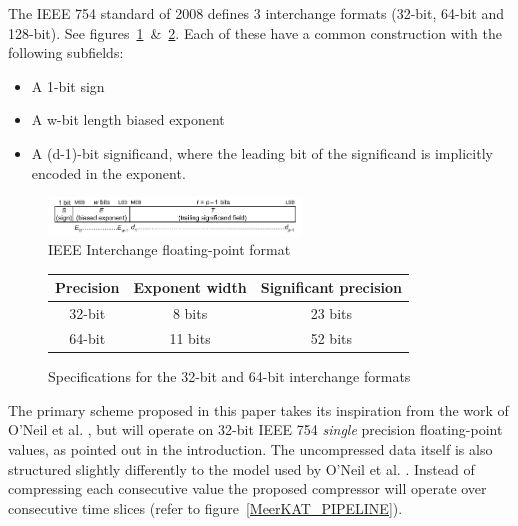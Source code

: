 The IEEE 754 standard of 2008 defines 3 interchange formats (32-bit, 64-bit and 128-bit). See figures~\ref{IEEE_FLOAT}~\&~\ref{IEEE_FLOAT_TAB}. Each of these have a common 
construction with the following subfields:
\begin{itemize}
 \item A 1-bit sign
 \item A w-bit length biased exponent
 \item A (d-1)-bit significand, where the leading bit of the significand is implicitly encoded in the exponent.
\end{itemize}
\begin{figure}[h!]
 \centering
 \includegraphics[width=0.6\textwidth]{IEEEinterchangeFormat.png}
 \caption{IEEE Interchange floating-point format \cite{4610935}}
 \label{IEEE_FLOAT}
\end{figure}
\begin{figure}[h!]
\centering
\begin{tabular}{|c|c|c|}
 \hline
 Precision & Exponent width & Significant precision \\
 \hline
 32-bit & 8 bits & 23 bits \\
 \hline
 64-bit & 11 bits & 52 bits \\
 \hline
\end{tabular}
\caption{Specifications for the 32-bit and 64-bit interchange formats}
 \label{IEEE_FLOAT_TAB}
\end{figure}
The primary scheme proposed in this paper takes its inspiration from the work of O'Neil et al. \cite{O'Neil:2011:FDC:1964179.1964189}, but will operate on 32-bit 
IEEE 754 \textit{single} precision floating-point values, as pointed out in the introduction. The uncompressed data itself is also structured slightly 
differently to the model used by O'Neil et al. \cite{O'Neil:2011:FDC:1964179.1964189}. Instead of compressing each consecutive value the proposed compressor will operate 
over consecutive time slices (refer to figure~\ref{MeerKAT_PIPELINE}).

